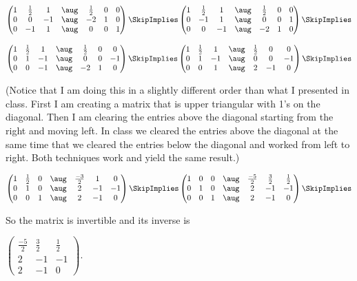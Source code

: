 \documentclass[oneside,12pt]{amsart}
\begin{document}
\bigskip

$
\begin{pmatrix}
1 & \frac{1}{2} & 1  &  \aug & \frac{1}{2} & 0 & 0 \\
0 & 0 & -1 &  \aug& -2 & 1 & 0 \\
0 & -1 & 1 & \aug & 0 & 0 & 1
\end{pmatrix}
\SkipImplies
\begin{pmatrix}
 1 & \frac{1}{2} & 1  &  \aug & \frac{1}{2} & 0 & 0 \\
0 & -1 & 1 & \aug & 0 & 0 & 1 \\
0 & 0 & -1 &  \aug& -2 & 1 & 0 \\
\end{pmatrix}
\SkipImplies
$

\bigskip

$
\begin{pmatrix}
1 & \frac{1}{2} & 1  &  \aug & \frac{1}{2} & 0 & 0 \\
0 & 1 & -1 & \aug & 0 & 0 & -1 \\
0 & 0 & -1 &  \aug& -2 & 1 & 0 \\
\end{pmatrix}
\SkipImplies
\begin{pmatrix}
1 & \frac{1}{2} & 1  &  \aug & \frac{1}{2} & 0 & 0 \\
0 & 1 & -1 & \aug & 0 & 0 & -1 \\
0 & 0 &  1 &  \aug&  2 & -1 & 0 \\
\end{pmatrix}
\SkipImplies
$

\bigskip

(Notice that I am doing this in a slightly different order than what I presented in class.
First I am creating a matrix that is upper triangular with 1's on the diagonal. Then
I am clearing the entries above the diagonal starting from the right and moving left.
In class we cleared the entries above the diagonal at the same time that we
cleared the entries below the diagonal and worked from left to right. Both techniques
work and yield the same result.)

\bigskip

$
\begin{pmatrix}
1 & \frac{1}{2} & 0 &  \aug &  \frac{-3}{2} & 1 & 0 \\
0 & 1 & 0 &            \aug &  2 & -1 & -1 \\
0 & 0 & 1 &            \aug &  2 & -1 & 0
\end{pmatrix}
\SkipImplies
\begin{pmatrix}
1 & 0 & 0 &    \aug &     \frac{-5}{2} & \frac{3}{2} & \frac{1}{2} \\
0 & 1 & 0 &    \aug &      2 & -1 & -1 \\
0 & 0 & 1 &    \aug &     2 & -1 & 0
\end{pmatrix}
\SkipImplies
$

\bigskip


So the matrix is invertible and its inverse is

\bigskip

$
\begin{pmatrix}
\frac{-5}{2} & \frac{3}{2} & \frac{1}{2} \\[6pt]
 2 & -1 & -1 \\
2 & -1 & 0
\end{pmatrix}
$.
\end{document}
